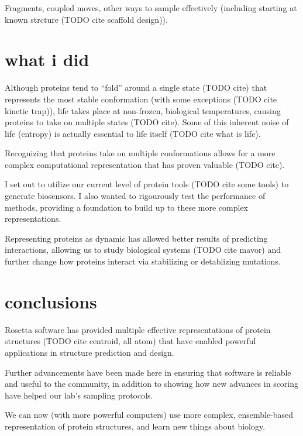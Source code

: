 Fragments, coupled moves, other ways to sample effectively (including starting at known strcture (TODO cite scaffold design)).

\section{what i did}
Although proteins tend to ``fold'' around a single state (TODO cite) that represents the most stable conformation (with some exceptions (TODO cite kinetic trap)), life takes place at non-frozen, biological temperatures, causing proteins to take on multiple states (TODO cite).
Some of this inherent noise of life (entropy) is actually essential to life itself (TODO cite what is life).

Recognizing that proteins take on multiple conformations allows for a more complex computational representation that has proven valuable (TODO cite).

I set out to utilize our current level of protein tools (TODO cite some tools) to generate biosensors.
I also wanted to rigourously test the performance of methods, providing a foundation to build up to these more complex representations.

Representing proteins as dynamic has allowed better results of predicting interactions, allowing us to study biological systems (TODO cite mavor) and further change how proteins interact via stabilizing or detablizing mutations.


\section{conclusions}

Rosetta software has provided multiple effective representations of protein structures (TODO cite centroid, all atom) that have enabled powerful applications in structure prediction and design.

Further advancements have been made here in ensuring that software is reliable and useful to the community, in addition to showing how new advances in scoring have helped our lab's sampling protocols.

We can now (with more powerful computers) use more complex, ensemble-based representation of protein structures, and learn new things about biology.